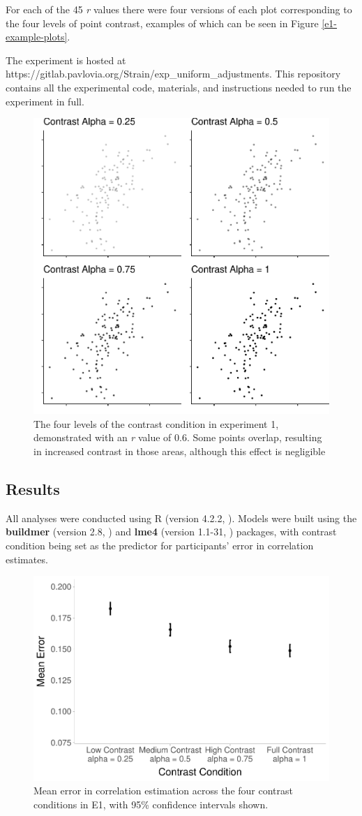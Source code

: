 \documentclass[preprint, 3p,
authoryear]{elsarticle} %
\begin{document}
For each of the 45 \emph{r} values there were four versions of each plot
corresponding to the four levels of point contrast, examples of which
can be seen in Figure \ref{e1-example-plots}.

The experiment is hosted at
https://gitlab.pavlovia.org/Strain/exp\_uniform\_adjustments. This
repository contains all the experimental code, materials, and
instructions needed to run the experiment in full.

\begin{figure}

\includegraphics[width=0.5\linewidth]{contrast_and_scatterplots_files/figure-latex/e1-example-plots-1} \hfill{}

\caption{\label{e1-example-plots}The four levels of the contrast condition in experiment 1, demonstrated with an \textit{r} value of 0.6. Some points overlap, resulting in increased contrast in those areas, although this effect is negligible}\label{fig:e1-example-plots}
\end{figure}

\hypertarget{results}{%
\subsection{Results}\label{results}}

All analyses were conducted using R (version 4.2.2, \citealp{r_core}).
Models were built using the \textbf{buildmer} (version 2.8,
\citealp{voeten_buildmer_2022}) and \textbf{lme4} (version 1.1-31,
\citealp{bates_lme4_2015}) packages, with contrast condition being set
as the predictor for participants' error in correlation estimates.

\begin{figure}

\includegraphics[width=0.5\linewidth]{contrast_and_scatterplots_files/figure-latex/e1-dot-plot-1} \hfill{}

\caption{\label{e1-dot-plot}Mean error in correlation estimation across the four contrast conditions in E1, with 95\% confidence intervals shown.}\label{fig:e1-dot-plot}
\end{figure}
\end{document}
